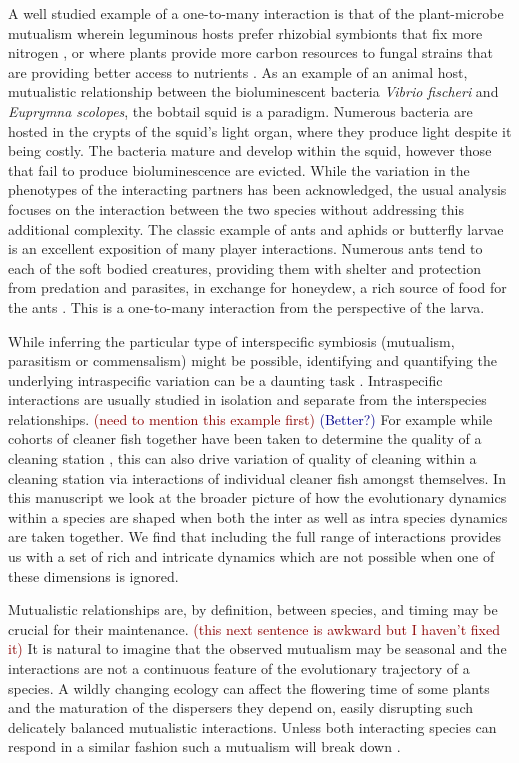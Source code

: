 \documentclass[12pt]{article}
\newcommand{\cha}[1]{\textcolor{darkblue}{(#1)}}
\newcommand{\marcus}[1]{\textcolor{darkred}{(#1)}}
\begin{document}
A well studied example of a one-to-many interaction is that of the plant-microbe mutualism wherein leguminous hosts prefer rhizobial symbionts that fix more nitrogen \citep{kiers:Nature:2003}, or where plants provide more carbon resources to fungal strains that are providing better access to nutrients \citep{kiers:Science:2011}.
As an example of an animal host, mutualistic relationship between the bioluminescent bacteria \textit{Vibrio fischeri} and \textit{Euprymna scolopes}, the bobtail squid \citep{mcfallngai:PLoSB:2014} is a paradigm. Numerous bacteria are hosted in the crypts of the squid's light organ, where they produce light despite it being costly. The bacteria mature and develop within the squid, however those that fail to produce bioluminescence are evicted. While the variation in the phenotypes of the interacting partners has been acknowledged, the usual analysis focuses on the interaction between the two species without addressing this additional complexity.
The classic example of ants and aphids or butterfly larvae \citep{pierce:BES:1987,hoelldobler:book:1990} is an excellent exposition of many player interactions. Numerous ants tend to each of the soft bodied creatures, providing them with shelter and protection from predation and parasites, in exchange for honeydew, a rich source of food for the ants \citep{hill:OEC:1989,stadler:book:2008}.
This is a one-to-many interaction from the perspective of the larva.

While inferring the particular type of interspecific symbiosis (mutualism, parasitism or commensalism) might be possible, identifying and quantifying the underlying intraspecific variation can be a daunting task \citep{behm:JE:2014}.  
Intraspecific interactions are usually studied in isolation and separate from the interspecies relationships. \marcus{need to mention this example first} \cha{Better?}
For example while cohorts of cleaner fish together have been taken to determine the quality of a cleaning station \citep{bshary:AB:2002,bshary:book:2003}, this can also drive variation of quality of cleaning within a cleaning station via interactions of individual cleaner fish amongst themselves.  
In this manuscript we look at the broader picture of how the evolutionary
dynamics within a species are shaped when both the inter as well as intra species
dynamics are taken together. 
We find that including the full range of interactions provides us with a set of rich and intricate dynamics which are not possible when one of these dimensions is ignored.

Mutualistic relationships are, by definition, between species, and timing may be crucial for their maintenance. \marcus{this next sentence is awkward but I haven't fixed it}
It is natural to imagine that the observed mutualism may be seasonal and the interactions are not a continuous feature of the evolutionary trajectory of a species. 
A wildly changing ecology can affect the flowering time of some plants and the maturation of the dispersers they depend on, easily disrupting such delicately balanced mutualistic interactions. 
Unless both interacting species can respond in a similar fashion such a mutualism will break down \citep{warren:GCB:2014}.
\end{document}

